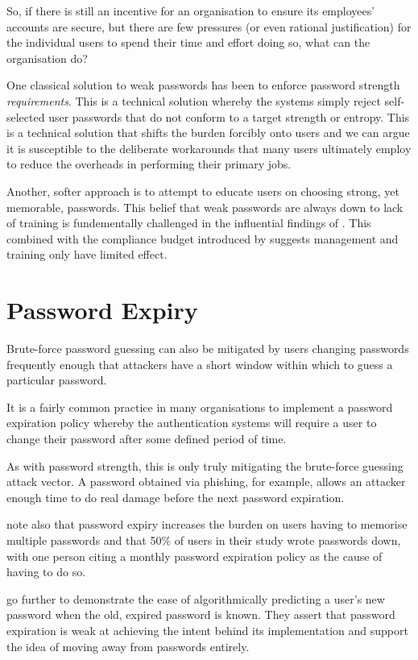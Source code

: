 \documentclass{report}
\begin{document}
So, if there is still an incentive for an organisation
to ensure its employees' accounts are secure, but there
are few pressures (or even rational justification)
for the individual users to spend their time and effort doing
so, what can the organisation do?

One classical solution to weak passwords
has been to enforce password strength \emph{requirements}.
This is a technical solution whereby the systems simply
reject self-selected user passwords that do not conform
to a target strength or entropy.
This is a technical solution that shifts the burden forcibly onto
users and we can argue it is susceptible to the deliberate workarounds
that many users ultimately employ to reduce the overheads
in performing their primary jobs.

Another, softer approach is to attempt to educate users
on choosing strong, yet memorable, passwords. This belief
that weak passwords are always down to lack of training
is fundementally challenged in the influential findings
of \textcite{adams1999users}. This combined with the
compliance budget introduced by \textcite{beautement2009compliance}
suggests management and training only have limited effect.

\section{Password Expiry}

Brute-force password guessing can also be mitigated by
users changing passwords frequently enough that attackers
have a short window within which to guess a particular
password.

It is a fairly common practice in many organisations to
implement a password expiration policy whereby the
authentication systems will require a user to change their
password after some defined period of time.

As with password strength, this is only truly mitigating the
brute-force guessing attack vector. A password obtained via
phishing, for example, allows an attacker enough time to do
real damage before the next password expiration.

\textcite{adams1999users} note also that password expiry increases
the burden on users having to memorise multiple passwords and that
50\% of users in their study wrote passwords down, with one
person citing a monthly password expiration policy as the cause
of having to do so.

\textcite{zhang2010security} go further to demonstrate the ease of
algorithmically predicting a user's new password when the old,
expired password is known. They assert that password expiration
is weak at achieving the intent behind its implementation and
support the idea of moving away from passwords entirely.
\end{document}
